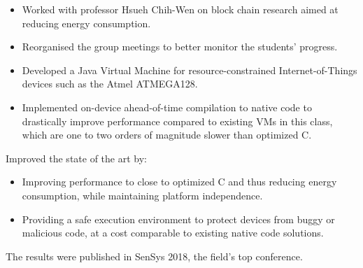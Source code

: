 \documentclass[10pt,a4paper]{../altacv}
\begin{document}
	\medskip
	
	

	\bigskip\bigskip{}
	
	\begin{itemize}
		\item Worked with professor Hsueh Chih-Wen on block chain research aimed at reducing energy consumption.
		\smallskip
		\item Reorganised the group meetings to better monitor the students' progress.
	\end{itemize}
	
	\medskip
	
	
	
	\bigskip\bigskip{}
	
	\begin{itemize}
		\item Developed a Java Virtual Machine for resource-constrained Internet-of-Things devices such as the Atmel ATMEGA128.
		\smallskip
		\item Implemented on-device ahead-of-time compilation to native code to drastically improve performance compared to existing VMs in this class, which are one to two orders of magnitude slower than optimized C.
	\end{itemize}
	
	\medskip
	
	Improved the state of the art by:
	
	\medskip
	
	\begin{itemize}
		\item Improving performance to close to optimized C and thus reducing energy consumption, while maintaining platform independence.
		\smallskip
		\item Providing a safe execution environment to protect devices from buggy or malicious code, at a cost comparable to existing native code solutions.
	\end{itemize}
	
	\medskip
	
	The results were published in SenSys 2018, the field's top conference.
	
\end{document}
